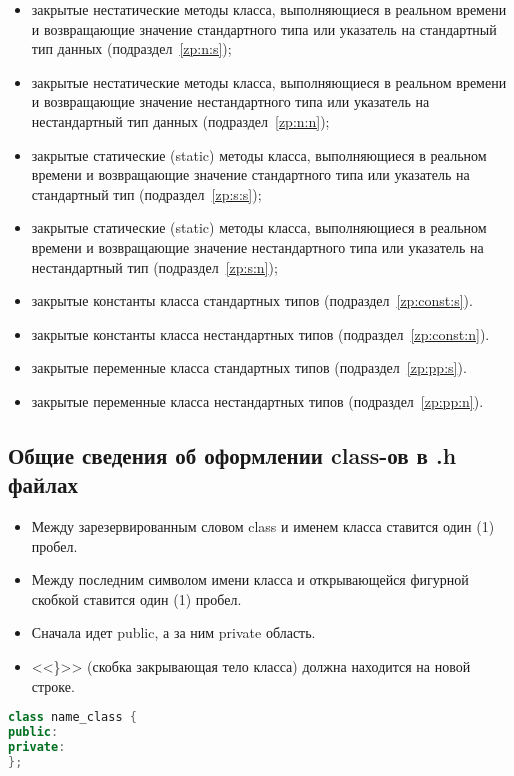 \begin{enumerate}
\begin{itemize}
		\item закрытые нестатические методы класса, выполняющиеся в реальном времени и возвращающие значение стандартного типа или указатель на стандартный тип данных (подраздел~\ref{zp:n:s});
		\item закрытые нестатические методы класса, выполняющиеся в реальном времени и возвращающие значение нестандартного типа или указатель на нестандартный тип данных (подраздел~\ref{zp:n:n});
		\item закрытые статические (static) методы класса, выполняющиеся в реальном времени и возвращающие значение стандартного типа или указатель на стандартный тип (подраздел~\ref{zp:s:s});
		\item закрытые статические (static) методы класса, выполняющиеся в реальном времени и возвращающие значение нестандартного типа или указатель на нестандартный тип (подраздел~\ref{zp:s:n});
		\item закрытые константы класса стандартных типов (подраздел~\ref{zp:const:s}).
		\item закрытые константы класса нестандартных типов (подраздел~\ref{zp:const:n}).
		\item закрытые переменные класса стандартных типов (подраздел~\ref{zp:pp:s}).
		\item закрытые переменные класса нестандартных типов (подраздел~\ref{zp:pp:n}).
	\end{itemize}
\end{enumerate}

\subsection{Общие сведения об оформлении class-ов в .h файлах}\label{OBK}
\begin{itemize}
	\item Между зарезервированным словом class и именем класса ставится один (1) пробел.
	\item Между последним символом имени класса и открывающейся фигурной скобкой ставится один (1) пробел.
	\item Сначала идет public, а за ним private область.
	\item <<\}>> (скобка закрывающая тело класса) должна находится на новой строке.
\end{itemize}\begin{lstlisting}[language=C++, frame=tlBR, basicstyle=\fontsize{10}{10}\ttfamily]
class name_class {
public:
private:
};\end{lstlisting}

